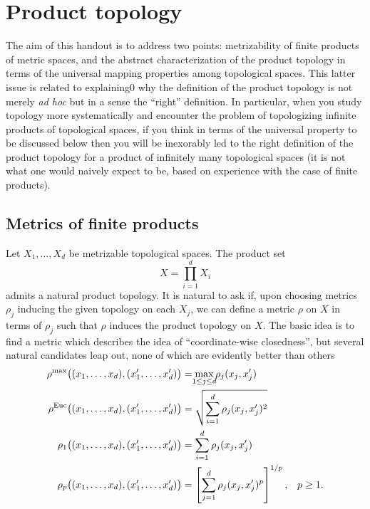 \section{Product topology}
The aim of this handout is to address two points: metrizability of finite
products of metric spaces, and the abstract characterization of the product
topology in terms of the universal mapping properties among topological
spaces. This latter issue is related to explaining0 why the definition of
the product topology is not merely \emph{ad hoc} but in a sense the
``right'' definition. In particular, when you study topology more
systematically and encounter the problem of topologizing infinite products
of topological spaces, if you think in terms of the universal property to
be discussed below then you will be inexorably led to the right
definition of the product topology for a product of infinitely many
topological spaces (it is not what one would naively expect to be, based on
experience with the case of finite products).

\subsection{Metrics of finite products}
Let \(X_1,\dotsc,X_d\) be metrizable topological spaces. The product set
\[
  X=\prod_{i=1}^d X_i
\]
admits a natural product topology. It is natural to ask if, upon choosing
metrics \(\rho_j\) inducing the given topology on each \(X_j\), we can
define a metric \(\rho\) on \(X\) in terms of \(\rho_j\) such that \(\rho\)
induces the product topology on \(X\). The basic idea is to find a metric
which describes the idea of ``coordinate-wise closedness'', but several
natural candidates leap out, none of which are evidently better than others
\begin{align*}
  \rho^{\text{max}}\bigl((x_1,\dotsc,x_d),(x_1',\dotsc,x_d')\bigr)
  &=\max_{\mathclap{1\leq j\leq d}}\rho_j(x_j,x_j')\\
  \rho^{\text{Euc}}\bigl((x_1,\dotsc,x_d),(x_1',\dotsc,x_d')\bigr)
  &=\sqrt{\sum_{i=1}^d\rho_j(x_j,x_j')^2}\\
  \rho_1\bigl((x_1,\dotsc,x_d),(x_1',\dotsc,x_d')\bigr)
  &=\sum_{i=1}^d\rho_j(x_j,x_j')\\
  \rho_p\bigl((x_1,\dotsc,x_d),(x_1',\dotsc,x_d')\bigr)
  &=\left[\sum_{j=1}^d\rho_j(x_j,x_j')^p\right]^{1/p},&p\geq 1.
\end{align*}

